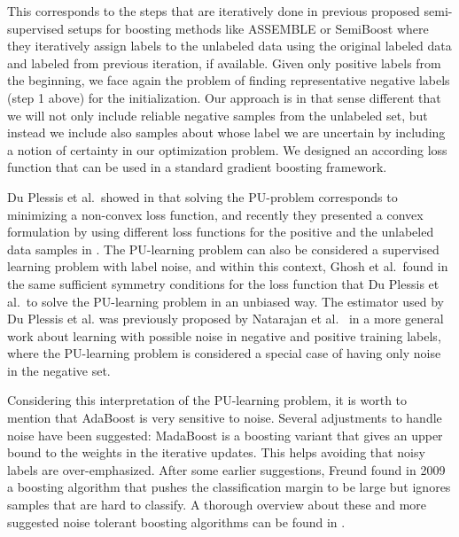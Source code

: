 This corresponds to the steps that are iteratively done in previous proposed semi-supervised setups for boosting methods like ASSEMBLE \cite{bennett2002exploiting} or SemiBoost \cite{mallapragada2009semiboost} where they iteratively assign labels to the unlabeled data using the original labeled data and labeled from previous iteration, if available. 
Given only positive labels from the beginning, we face again the problem of finding representative negative labels (step 1 above) for the initialization. Our approach is in that sense different that we will not only include reliable negative samples from the unlabeled set, but instead we include also samples about whose label we are uncertain by including a notion of certainty in our optimization problem. We designed an according loss function that can be used in a standard gradient boosting framework.

Du Plessis et al.\ showed in \cite{plessis2014PUanalysis} that solving the PU-problem corresponds to minimizing a non-convex loss function, and recently they presented a convex formulation by using different loss functions for the positive and the unlabeled data samples in \cite{plessis2015convex}. The PU-learning problem can also be considered a supervised learning problem with label noise, and within this context, Ghosh et al.\ found in \cite{ghosh2015making} the same sufficient symmetry conditions for the loss function that Du Plessis et al.\ to solve the PU-learning problem in an unbiased way. The estimator used by Du Plessis et al. was previously proposed by Natarajan et al.\ \cite{natarajan2013learning} in a more general work about learning with possible noise in negative and positive training labels, where the PU-learning problem is considered a special case of having only noise in the negative set.

Considering this interpretation of the PU-learning problem, it is worth to mention that AdaBoost is very sensitive to noise. Several adjustments to handle noise have been suggested: MadaBoost \cite{domingo2000madaboost} is a boosting variant that gives an upper bound to the weights in the iterative updates. This helps avoiding that noisy labels are over-emphasized. 
After some earlier suggestions, Freund found in 2009 a boosting algorithm \cite{freund2009more} that pushes the classification margin to be large but ignores samples that are hard to classify. A thorough overview about these and more suggested noise tolerant boosting algorithms can be found in \cite{zhou2012ensemble}.
